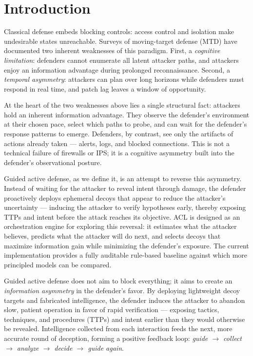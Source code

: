 \documentclass[11pt]{article}
\begin{document}
\section{Introduction}
\label{sec:intro}

Classical defense embeds blocking controls: access control and isolation make
undesirable states unreachable. Surveys of moving-target defense (MTD) have
documented two inherent weaknesses of this paradigm. First, a
\textit{cognitive limitation}: defenders cannot enumerate all latent attacker
paths, and attackers enjoy an information advantage during prolonged
reconnaissance. Second, a \textit{temporal asymmetry}: attackers can plan
over long horizons while defenders must respond in real time, and patch lag
leaves a window of opportunity.

At the heart of the two weaknesses above lies a single structural fact: attackers hold an inherent information advantage. They observe the defender's environment at their chosen pace, select which paths to probe, and can wait for the defender's response patterns to emerge. Defenders, by contrast, see only the artifacts of actions already taken --- alerts, logs, and blocked connections. This is not a technical failure of firewalls or IPS; it is a cognitive asymmetry built into the defender's observational posture.

Guided active defense, as we define it, is an attempt to reverse this asymmetry. Instead of waiting for the attacker to reveal intent through damage, the defender proactively deploys ephemeral decoys that appear to reduce the attacker's uncertainty --- inducing the attacker to verify hypotheses early, thereby exposing TTPs and intent before the attack reaches its objective. ACL is designed as an orchestration engine for exploring this reversal: it estimates what the attacker believes, predicts what the attacker will do next, and selects decoys that maximize information gain while minimizing the defender's exposure. The current implementation provides a fully auditable rule-based baseline against which more principled models can be compared.

Guided active defense does not aim to block everything; it aims to create an
\textit{information asymmetry} in the defender's favor. By deploying
lightweight decoy targets and fabricated intelligence, the defender induces
the attacker to abandon slow, patient operation in favor of rapid
verification --- exposing tactics, techniques, and procedures (TTPs) and
intent earlier than they would otherwise be revealed. Intelligence collected
from each interaction feeds the next, more accurate round of deception,
forming a positive feedback loop: \textit{guide $\rightarrow$ collect
$\rightarrow$ analyze $\rightarrow$ decide $\rightarrow$ guide again}.
\end{document}
